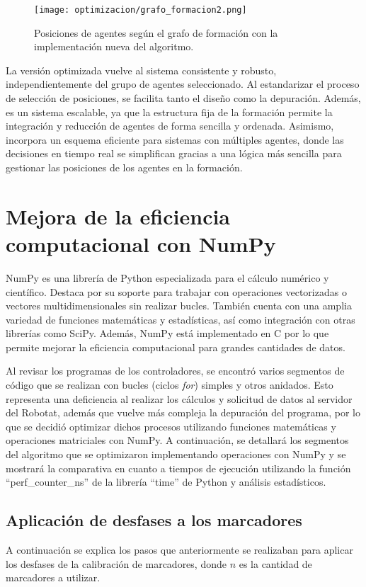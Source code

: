 \begin{figure}[H]
	\centering
	\texttt{[image: optimizacion/grafo\_formacion2.png]}
	\caption{Posiciones de agentes según el grafo de formación con la implementación nueva del algoritmo.}
	\label{fig:grafo_formacion2}
\end{figure}

La versión optimizada vuelve al sistema consistente y robusto, independientemente del grupo de agentes seleccionado. Al estandarizar el proceso de selección de posiciones, se facilita tanto el diseño como la depuración. Además, es un sistema escalable, ya que la estructura fija de la formación permite la integración y reducción de agentes de forma sencilla y ordenada. Asimismo, incorpora un esquema eficiente para sistemas con múltiples agentes, donde las decisiones en tiempo real se simplifican gracias a una lógica más sencilla para gestionar las posiciones de los agentes en la formación.

\section{Mejora de la eficiencia computacional con NumPy}
NumPy es una librería de Python especializada para el cálculo numérico y científico. Destaca por su soporte para trabajar con operaciones vectorizadas o vectores multidimensionales sin realizar bucles. También cuenta con una amplia variedad de funciones matemáticas y estadísticas, así como integración con otras librerías como SciPy. Además, NumPy está implementado en C por lo que permite mejorar la eficiencia computacional para grandes cantidades de datos.

Al revisar los programas de los controladores, se encontró varios segmentos de código que se realizan con bucles (ciclos \textit{for}) simples y otros anidados. Esto representa una deficiencia al realizar los cálculos y solicitud de datos al servidor del Robotat, además que vuelve más compleja la depuración del programa, por lo que se decidió optimizar dichos procesos utilizando funciones matemáticas y operaciones matriciales con NumPy. A continuación, se detallará los segmentos del algoritmo que se optimizaron implementando operaciones con NumPy y se mostrará la comparativa en cuanto a tiempos de ejecución utilizando la función ``perf\_counter\_ns'' de la librería ``time'' de Python y análisis estadísticos.

\subsection{Aplicación de desfases a los marcadores}
A continuación se explica los pasos que anteriormente se realizaban para aplicar los desfases de la calibración de marcadores, donde $n$ es la cantidad de marcadores a utilizar.

